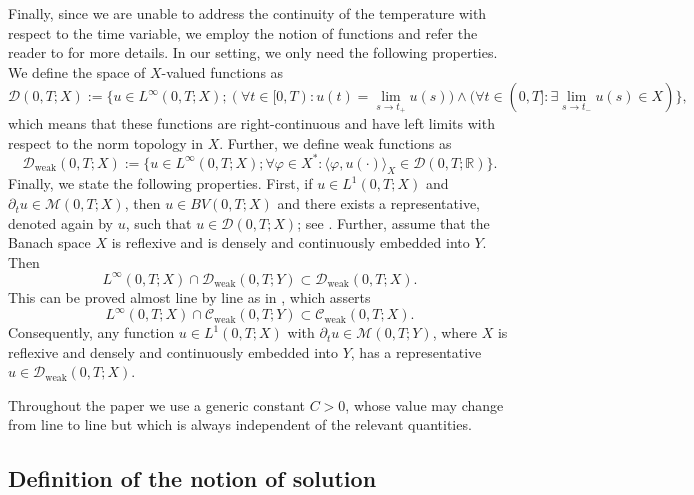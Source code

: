 \documentclass[11pt, a4paper, reqno]{amsart}
\newcommand{\R}{{\mathbb R}}
\numberwithin{equation}{section}
\begin{document}
Finally, since we are unable to address the continuity of the temperature with respect to the time variable, we employ the notion of \cad functions and refer the reader to \cite{AbLiSc24,Am90} for more details. In our setting, we only need the following properties. We define the space of $X$-valued \cad functions as
$$
\mathcal{D}(0,T; X):=\{u\in L^{\infty}(0,T; X); (\forall t\in [0,T): u(t) = \lim_{s\to t_+} u(s))\land (\forall t\in (0,T]:\exists \lim_{s\to t_{-}}u(s)\in X)\},
$$
which means that these functions are right-continuous and have left limits with respect to the norm topology in $X$. Further, we define weak \cad functions as
$$
\mathcal{D}_{\textrm{weak}}(0,T; X):=\{u\in L^{\infty}(0,T; X); \forall \varphi \in X^*: \langle \varphi,u(\cdot) \rangle_X \in \mathcal{D}(0,T; \R) \}.
$$
Finally, we state the following properties. First, if $u\in L^1(0,T; X)$ and $\partial_t u\in \mathcal{M}(0,T; X)$, then $u\in BV(0,T; X)$ %
and there exists a representative, denoted again by $u$, such that $u \in \mathcal{D}(0,T; X)$; see \cite[Lemma~2.5]{AbLiSc24}. Further, assume that the Banach space $X$ is reflexive and is densely and continuously embedded into $Y$. Then
$$
L^{\infty}(0,T; X) \cap \mathcal{D}_{\textrm{weak}}(0,T; Y) \subset \mathcal{D}_{\textrm{weak}}(0,T; X).
$$
This can be proved almost line by line as in \cite[Lemma~III.1.4]{temam79}, which asserts
$$
L^{\infty}(0,T; X) \cap \mathcal{C}_{\mathrm{weak}}(0,T; Y) \subset \mathcal{C}_{\mathrm{weak}}(0,T; X).
$$
Consequently, any function $u \in L^1(0,T; X)$ with $\partial_t u \in \mathcal{M}(0,T; Y)$, where $X$ is reflexive and densely and continuously embedded into $Y$, has a representative $u \in \mathcal{D}_{\textrm{weak}}(0,T; X)$.


Throughout the paper we use a generic constant $C>0$, whose value may change from line to line but which is always independent of the relevant quantities.  

\subsection{Definition of the notion of solution}
\end{document}

